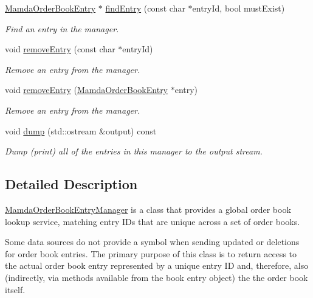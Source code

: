 \begin{CompactItemize}
\hyperlink{classWombat_1_1MamdaOrderBookEntry}{Mamda\-Order\-Book\-Entry} $\ast$ \hyperlink{classWombat_1_1MamdaOrderBookEntryManager_e718aadca369ac8556ebc8c6f84a5c22}{find\-Entry} (const char $\ast$entry\-Id, bool must\-Exist)
\begin{CompactList}\small\item\em Find an entry in the manager. \item\end{CompactList}\item 
void \hyperlink{classWombat_1_1MamdaOrderBookEntryManager_76d6e0eddbcd6c44eaf3e16402df0343}{remove\-Entry} (const char $\ast$entry\-Id)
\begin{CompactList}\small\item\em Remove an entry from the manager. \item\end{CompactList}\item 
void \hyperlink{classWombat_1_1MamdaOrderBookEntryManager_fe3edb292b8057ceeb7d1afe1c4a60b7}{remove\-Entry} (\hyperlink{classWombat_1_1MamdaOrderBookEntry}{Mamda\-Order\-Book\-Entry} $\ast$entry)
\begin{CompactList}\small\item\em Remove an entry from the manager. \item\end{CompactList}\item 
void \hyperlink{classWombat_1_1MamdaOrderBookEntryManager_58202cded81c490e26550eafc7f81db7}{dump} (std::ostream \&output) const 
\begin{CompactList}\small\item\em Dump (print) all of the entries in this manager to the output stream. \item\end{CompactList}\end{CompactItemize}


\subsection{Detailed Description}
\hyperlink{classWombat_1_1MamdaOrderBookEntryManager}{Mamda\-Order\-Book\-Entry\-Manager} is a class that provides a global order book lookup service, matching entry IDs that are unique across a set of order books. 

Some data sources do not provide a symbol when sending updated or deletions for order book entries. The primary purpose of this class is to return access to the actual order book entry represented by a unique entry ID and, therefore, also (indirectly, via methods available from the book entry object) the the order book itself. 



